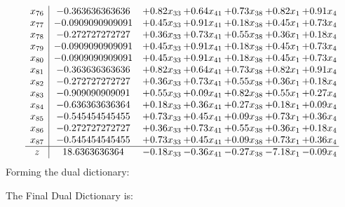 \documentclass[8pt]{article}
\begin{document}
\[\begin{array}{c| c c@{\hskip 2pt} c@{\hskip 2pt} c@{\hskip 2pt} c@{\hskip 2pt} c@{\hskip 2pt} }
 x_{76}   &  -0.363636363636 & +  0.82 x_{33} & +  0.64 x_{41} & +  0.73 x_{38} & +  0.82 x_{1} & +  0.91 x_{4}\\
 x_{77}   &  -0.0909090909091 & +  0.45 x_{33} & +  0.91 x_{41} & +  0.18 x_{38} & +  0.45 x_{1} & +  0.73 x_{4}\\
 x_{78}   &  -0.272727272727 & +  0.36 x_{33} & +  0.73 x_{41} & +  0.55 x_{38} & +  0.36 x_{1} & +  0.18 x_{4}\\
 x_{79}   &  -0.0909090909091 & +  0.45 x_{33} & +  0.91 x_{41} & +  0.18 x_{38} & +  0.45 x_{1} & +  0.73 x_{4}\\
 x_{80}   &  -0.0909090909091 & +  0.45 x_{33} & +  0.91 x_{41} & +  0.18 x_{38} & +  0.45 x_{1} & +  0.73 x_{4}\\
 x_{81}   &  -0.363636363636 & +  0.82 x_{33} & +  0.64 x_{41} & +  0.73 x_{38} & +  0.82 x_{1} & +  0.91 x_{4}\\
 x_{82}   &  -0.272727272727 & +  0.36 x_{33} & +  0.73 x_{41} & +  0.55 x_{38} & +  0.36 x_{1} & +  0.18 x_{4}\\
 x_{83}   &  -0.909090909091 & +  0.55 x_{33} & +  0.09 x_{41} & +  0.82 x_{38} & +  0.55 x_{1} & +  0.27 x_{4}\\
 x_{84}   &  -0.636363636364 & +  0.18 x_{33} & +  0.36 x_{41} & +  0.27 x_{38} & +  0.18 x_{1} & +  0.09 x_{4}\\
 x_{85}   &  -0.545454545455 & +  0.73 x_{33} & +  0.45 x_{41} & +  0.09 x_{38} & +  0.73 x_{1} & +  0.36 x_{4}\\
 x_{86}   &  -0.272727272727 & +  0.36 x_{33} & +  0.73 x_{41} & +  0.55 x_{38} & +  0.36 x_{1} & +  0.18 x_{4}\\
 x_{87}   &  -0.545454545455 & +  0.73 x_{33} & +  0.45 x_{41} & +  0.09 x_{38} & +  0.73 x_{1} & +  0.36 x_{4}\\
\hline
z    &  18.6363636364 & -0.18 x_{33} & -0.36 x_{41} & -0.27 x_{38} & -7.18 x_{1} & -0.09 x_{4}\\
\end{array}\]
Forming the dual dictionary:

The Final Dual Dictionary is: 
\end{document}
